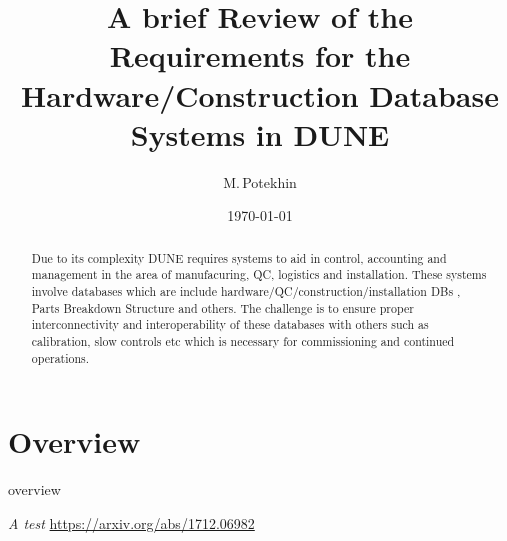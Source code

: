 \documentclass[pdftex,12pt,letter]{article}
\title{A brief Review of the Requirements for the Hardware/Construction Database Systems in DUNE}
\date{\today}
\author{M.\,Potekhin}
\begin{document}
\maketitle

\begin{abstract}
\noindent  Due to its complexity DUNE requires systems to aid in control, accounting and management
in the area of manufacuring, QC, logistics and installation. These systems involve databases which
are include hardware/QC/construction/installation DBs , Parts Breakdown Structure and others.
The challenge is to ensure proper interconnectivity and interoperability of these databases with
others such as calibration, slow controls etc which is necessary for commissioning and continued
operations.

\end{abstract}


\section{Overview}

overview




\clearpage

\begin{thebibliography}{1}

{\textit{A test} \url{https://arxiv.org/abs/1712.06982}}

\end{thebibliography}
\end{document}
